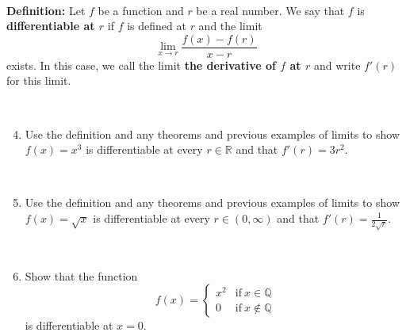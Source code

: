 \documentclass[12pt]{amsart}
\newcommand{\Q}{\mathbb{Q}}
\newcommand{\R}{\mathbb{R}}
\newcommand{\ds}{\displaystyle}
\begin{document}
\

\begin{framed}
\noindent \textbf{Definition:} Let $f$ be a function and $r$ be a real number. We say that $f$ is \textbf{differentiable at $r$} if $f$ is defined at $r$ and the limit
\[ \lim_{x\to r} \frac{ f(x) - f(r) }{x-r}\]
exists. In this case, we call the limit \textbf{the derivative of $f$ at $r$} and write $f'(r)$ for this limit.
\end{framed}

\

\begin{enumerate}\setcounter{enumi}{3}
\item Use the definition and any theorems and previous examples of limits to show $f(x)= x^3$  is differentiable at every $r\in \R$ and that $f'(r) = 3r^2$.

\

\item Use the definition and any theorems and previous examples of limits to show $f(x)= \sqrt{x}$  is differentiable at every $r\in (0,\infty)$ and that $\ds f'(r) = \frac{1}{2\sqrt{r}}$.

\


\item Show that the function 
\[ f(x) = \begin{cases} x^2 & \text{if} \ x\in \Q \\ 0 & \text{if} \ x\notin \Q\end{cases} \]
is differentiable at $x=0$.


\end{enumerate}
\end{document}
